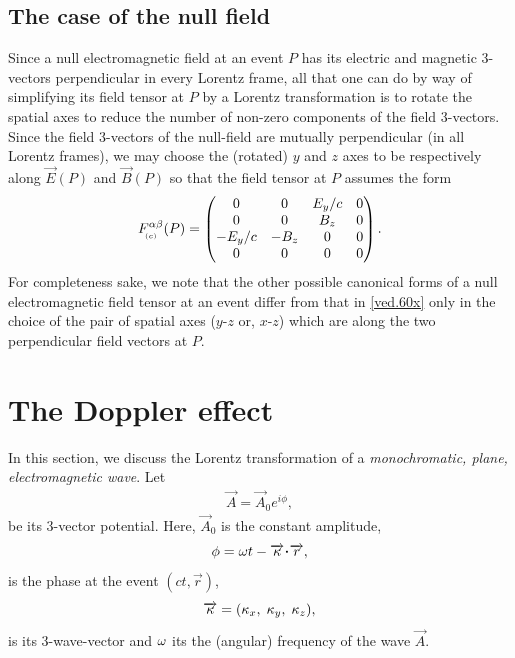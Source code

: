 \subsection{The case of the null field}
Since a null electromagnetic field  at an event $P$ has its 
electric and magnetic 3-vectors perpendicular in every  
Lorentz frame, all that one can do by way of   
simplifying  its field tensor at $P$ by a Lorentz   
transformation is to rotate the spatial axes to reduce the 
number of non-zero components of the field 3-vectors. Since 
the field 3-vectors of the null-field are mutually   
perpendicular (in all Lorentz frames),  we may choose the 
(rotated) $y$ and $z$ axes to be respectively along 
$\vec{E}(P)$ and  $\vec{B}(P)$ so that the field tensor at 
$P$ 
assumes the form
\begin{align}\label{ved.60x}
F^{{\alpha}{\beta}}_{_{\hspace*{-1.5pt}{(c)}}}(P)
=\begin{pmatrix}
0 & 0 &E_y/c &0 \\
0 & 0 & B_z & 0 \\
-E_y/c  & -B_z & 0 & 0\\
0 & 0 & 0 & 0 
\end{pmatrix}.
\end{align}
For completeness sake, we note that the other possible
canonical forms of a null electromagnetic field tensor at an
event differ from that in \eqref{ved.60x} only in the 
choice of the pair of spatial axes ($y$-$z$ or, $x$-$z$) 
which are along the two perpendicular field vectors at $P$.

\section{The Doppler effect}
In this section, we  discuss the Lorentz transformation of 
a  \textsl{monochromatic, plane, electromagnetic wave}. 
Let
\begin{align}\label{ved.61x}
\vec{A}=\vec{A}_0e^{i\phi},
\end{align}
be its 3-vector potential. Here, $\vec{A}_0$ is the constant
amplitude,
\begin{align}\label{ved.62x}
\phi =\gkw t -\vec{\gkk}\dotp \vec{r},
\end{align}
is the phase  at the event
$(ct,\vec{r})$,
\begin{align}\label{ved.63x}
\overrightarrow{{\kappa}}=({\kappa}_x, \;{\kappa}_y,\;{\kappa}_z),
\end{align}
is its {3-wave-vector} and ${\omega}$ its the (angular) 
{frequency} of the wave $\vec{A}$.

